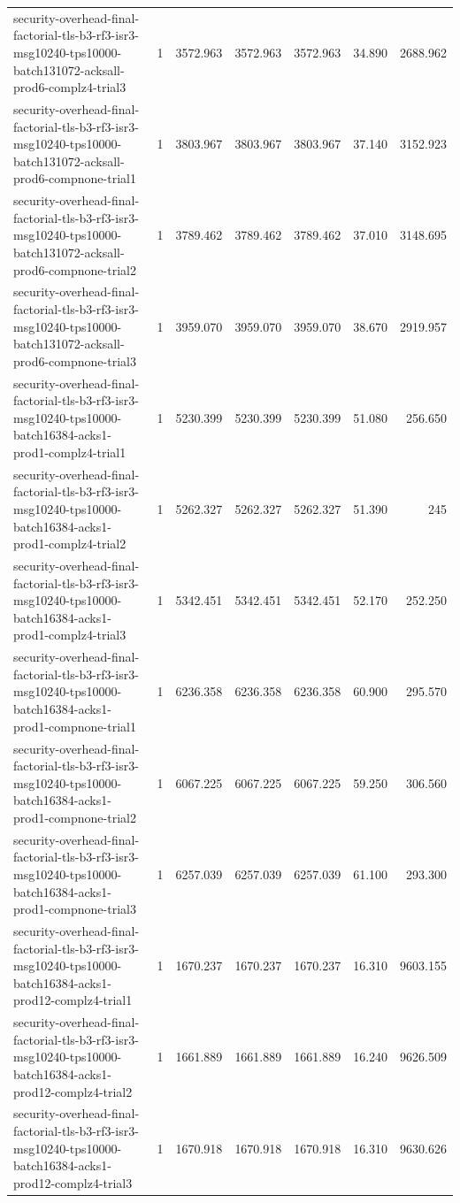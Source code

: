 \begin{tabular}{lrrrrrr}
security-overhead-final-factorial-tls-b3-rf3-isr3-msg10240-tps10000-batch131072-acksall-prod6-complz4-trial3 & 1 & 3572.963 & 3572.963 & 3572.963 & 34.890 & 2688.962 \\
security-overhead-final-factorial-tls-b3-rf3-isr3-msg10240-tps10000-batch131072-acksall-prod6-compnone-trial1 & 1 & 3803.967 & 3803.967 & 3803.967 & 37.140 & 3152.923 \\
security-overhead-final-factorial-tls-b3-rf3-isr3-msg10240-tps10000-batch131072-acksall-prod6-compnone-trial2 & 1 & 3789.462 & 3789.462 & 3789.462 & 37.010 & 3148.695 \\
security-overhead-final-factorial-tls-b3-rf3-isr3-msg10240-tps10000-batch131072-acksall-prod6-compnone-trial3 & 1 & 3959.070 & 3959.070 & 3959.070 & 38.670 & 2919.957 \\
security-overhead-final-factorial-tls-b3-rf3-isr3-msg10240-tps10000-batch16384-acks1-prod1-complz4-trial1 & 1 & 5230.399 & 5230.399 & 5230.399 & 51.080 & 256.650 \\
security-overhead-final-factorial-tls-b3-rf3-isr3-msg10240-tps10000-batch16384-acks1-prod1-complz4-trial2 & 1 & 5262.327 & 5262.327 & 5262.327 & 51.390 & 245 \\
security-overhead-final-factorial-tls-b3-rf3-isr3-msg10240-tps10000-batch16384-acks1-prod1-complz4-trial3 & 1 & 5342.451 & 5342.451 & 5342.451 & 52.170 & 252.250 \\
security-overhead-final-factorial-tls-b3-rf3-isr3-msg10240-tps10000-batch16384-acks1-prod1-compnone-trial1 & 1 & 6236.358 & 6236.358 & 6236.358 & 60.900 & 295.570 \\
security-overhead-final-factorial-tls-b3-rf3-isr3-msg10240-tps10000-batch16384-acks1-prod1-compnone-trial2 & 1 & 6067.225 & 6067.225 & 6067.225 & 59.250 & 306.560 \\
security-overhead-final-factorial-tls-b3-rf3-isr3-msg10240-tps10000-batch16384-acks1-prod1-compnone-trial3 & 1 & 6257.039 & 6257.039 & 6257.039 & 61.100 & 293.300 \\
security-overhead-final-factorial-tls-b3-rf3-isr3-msg10240-tps10000-batch16384-acks1-prod12-complz4-trial1 & 1 & 1670.237 & 1670.237 & 1670.237 & 16.310 & 9603.155 \\
security-overhead-final-factorial-tls-b3-rf3-isr3-msg10240-tps10000-batch16384-acks1-prod12-complz4-trial2 & 1 & 1661.889 & 1661.889 & 1661.889 & 16.240 & 9626.509 \\
security-overhead-final-factorial-tls-b3-rf3-isr3-msg10240-tps10000-batch16384-acks1-prod12-complz4-trial3 & 1 & 1670.918 & 1670.918 & 1670.918 & 16.310 & 9630.626 \\

\end{tabular}
